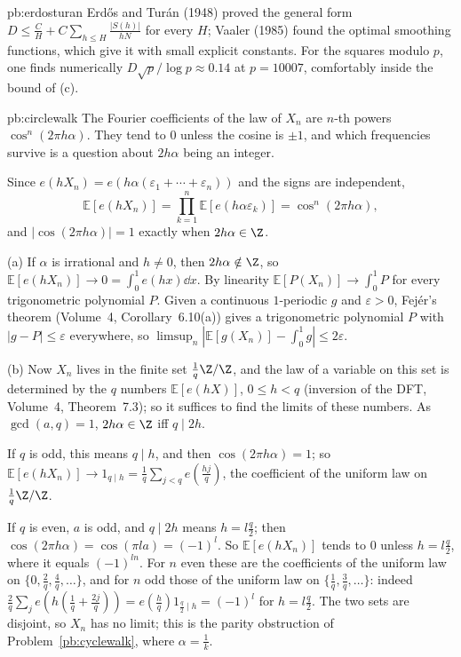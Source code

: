 \begin{solution}{pb:erdosturan}
\leads Erdős and Turán (1948) proved the general form $D\le\frac C H+C\sum_{h\le H}\frac{|S(h)|}{hN}$ for every $H$; Vaaler (1985) found the optimal
smoothing functions, which give it with small explicit constants. For the squares modulo $p$, one finds numerically $D\sqrt p/\log p\approx0.14$
at $p=10007$, comfortably inside the bound of (c).
\end{solution}

\begin{solution}{pb:circlewalk}
\idea The Fourier coefficients of the law of $X_n$ are $n$-th powers $\cos^n(2\pi h\alpha)$. They tend to $0$ unless the cosine is $\pm1$, and
which frequencies survive is a question about $2h\alpha$ being an integer.

\writeup Since $e(hX_n)=e(h\alpha(\varepsilon_1+\cdots+\varepsilon_n))$ and the signs are independent,
\[
\mathbb E[e(hX_n)]=\prod_{k=1}^n\mathbb E[e(h\alpha\varepsilon_k)]=\cos^n(2\pi h\alpha),
\]
and $|\cos(2\pi h\alpha)|=1$ exactly when $2h\alpha\in\Z$.

(a) If $\alpha$ is irrational and $h\ne0$, then $2h\alpha\notin\Z$, so $\mathbb E[e(hX_n)]\to0=\int_0^1e(hx)\dd x$. By linearity $\mathbb E[P(X_n)]\to\int_0^1P$ for every
trigonometric polynomial $P$. Given a continuous $1$-periodic $g$ and $\varepsilon>0$, Fejér's theorem (Volume~4, Corollary~6.10(a)) gives a
trigonometric polynomial $P$ with $|g-P|\le\varepsilon$ everywhere, so $\limsup_n|\mathbb E[g(X_n)]-\int_0^1g|\le2\varepsilon$.

(b) Now $X_n$ lives in the finite set $\frac1q\Z/\Z$, and the law of a variable on this set is determined by the $q$ numbers $\mathbb E[e(hX)]$,
$0\le h<q$ (inversion of the DFT, Volume~4, Theorem~7.3); so it suffices to find the limits of these numbers. As $\gcd(a,q)=1$, $2h\alpha\in\Z$ iff
$q\mid2h$.

If $q$ is odd, this means $q\mid h$, and then $\cos(2\pi h\alpha)=1$; so $\mathbb E[e(hX_n)]\to1_{q\mid h}=\frac1q\sum_{j<q}e(\frac{hj}q)$, the coefficient of the uniform law on
$\frac1q\Z/\Z$.

If $q$ is even, $a$ is odd, and $q\mid2h$ means $h=l\frac q2$; then $\cos(2\pi h\alpha)=\cos(\pi la)=(-1)^l$. So $\mathbb E[e(hX_n)]$ tends to $0$ unless $h=l\frac q2$,
where it equals $(-1)^{ln}$. For $n$ even these are the coefficients of the uniform law on $\{0,\frac2q,\frac4q,\dots\}$, and for $n$ odd those of the
uniform law on $\{\frac1q,\frac3q,\dots\}$: indeed $\frac2q\sum_je(h(\frac1q+\frac{2j}q))=e(\frac hq)1_{\frac q2\mid h}=(-1)^l$ for $h=l\frac q2$. The two sets are disjoint, so
$X_n$ has no limit; this is the parity obstruction of Problem~\ref{pb:cyclewalk}, where $\alpha=\frac1k$.


\end{solution}
